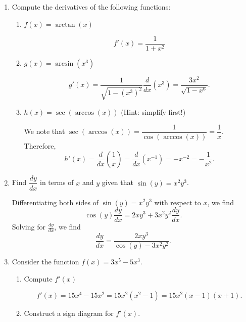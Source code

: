\documentclass[12pt]{article}
\newcommand{\points}[1]{\marginpar{\hspace{24pt}[#1]}}
\begin{document}
\thispagestyle{fancy}

 \begin{enumerate}
 \item  Compute the derivatives of the following functions:
\begin{enumerate}
 \item $f(x) = \arctan(x)$ \points{2}

\bigskip

\[
 f'(x) = \frac{1}{1+x^2}
\]

\bigskip

 \item $g(x) = \arcsin(x^3)$ \points{2}

\bigskip

\[
 g'(x) = \frac{1}{\sqrt{1-(x^3)^2}}\frac{d}{dx}(x^3) = \frac{3x^2}{\sqrt{1-x^6}}.
\]

\bigskip

 \item $h(x) = \sec(\arccos(x))$ \points{2} \quad (Hint: simplify first!)

\bigskip

We note that $\sec(\arccos(x)) = \dfrac{1}{\cos(\arccos(x))} = \dfrac{1}{x}$. Therefore,
\[
 h'(x) = \frac{d}{dx}\left(\frac{1}{x}\right) = \frac{d}{dx}(x^{-1}) = -x^{-2} = -\frac{1}{x^2}.
\]

\bigskip


\end{enumerate}

\item Find $\dfrac{dy}{dx}$ in terms of $x$ and $y$ given that \points{3} $\sin(y)=x^2y^3$.

\bigskip

Differentiating both sides of $\sin(y)=x^2y^3$ with respect to $x$, we find
\[
 \cos(y)\frac{dy}{dx} = 2xy^3+3x^2y^2\frac{dy}{dx}.
\]
Solving for $\frac{dy}{dx}$, we find
\[
 \frac{dy}{dx} = \frac{2xy^3}{\cos(y)-3x^2y^2}.
\]

\newpage

\item Consider the function $f(x)=3x^5-5x^3$.
\begin{enumerate}
 \item Compute $f'(x)$ \points{1}

\medskip

\[
 f'(x) = 15x^4-15x^2=15x^2(x^2-1)=15x^2(x-1)(x+1).
\]

\medskip

 \item Construct a sign diagram for $f'(x)$. \points{1}


\end{enumerate}
\end{enumerate}
\end{document}
